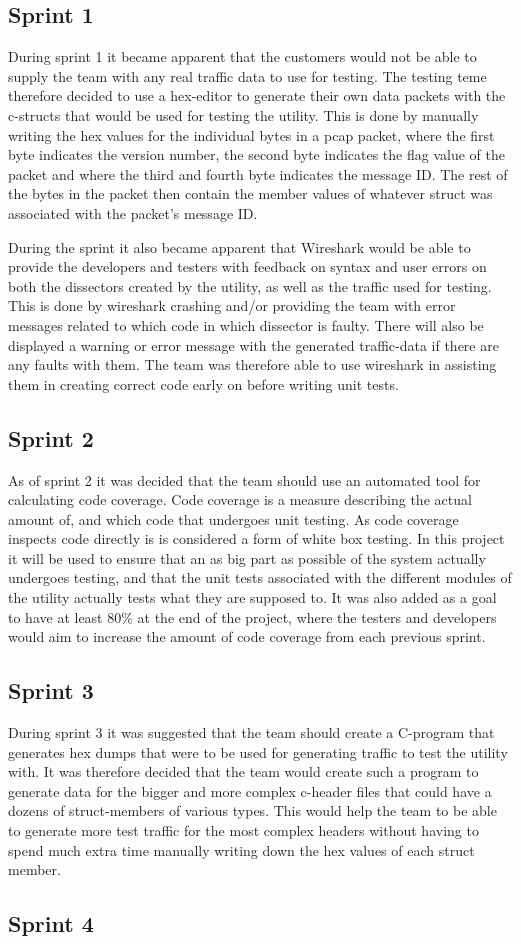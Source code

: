 \subsection{Sprint 1}
During sprint 1 it became apparent that the customers would not be able to supply the team with any real traffic data to use for testing. The testing teme therefore decided to use a hex-editor to generate their own data packets with the c-structs that would be used for testing the utility. This is done by manually writing the hex values for the individual bytes in a pcap packet, where the first byte indicates the version number, the second byte indicates the flag value of the packet and where the third and fourth byte indicates the message ID. The rest of the bytes in the packet then contain the member values of whatever struct was associated with the packet's message ID.

During the sprint it also became apparent that Wireshark would be able to provide the developers and testers with feedback on syntax and user errors on both the dissectors created by the utility, as well as the traffic used for testing. This is done by wireshark crashing and/or providing the team with error messages related to which code in which dissector is faulty. There will also be displayed a warning or error message with the generated traffic-data if there are any faults with them. The team was therefore able to use wireshark in assisting them in creating correct code early on before writing unit tests.   

\subsection{Sprint 2}
As of sprint 2 it was decided that the team should use an automated tool for calculating code coverage. Code coverage is a measure describing the actual amount of, and which code that undergoes unit testing. As code coverage inspects code directly is is considered a form of white box testing. In this project it will be used to ensure that an as big part as possible of the system actually undergoes testing, and that the unit tests associated with the different modules of the utility actually tests what they are supposed to. It was also added as a goal to have at least 80\% at the end of the project, where the testers and developers would aim to increase the amount of code coverage from each previous sprint.

\subsection{Sprint 3}
During sprint 3 it was suggested that the team should create a C-program that generates hex dumps that were to be used for generating traffic to test the utility with. It was therefore decided that the team would create such a program to generate data for the bigger and more complex c-header files that could have a dozens of struct-members of various types. This would help the team to be able to generate more test traffic for the most complex headers without having to spend much extra time manually writing down the hex values of each struct member.

\subsection{Sprint 4}

